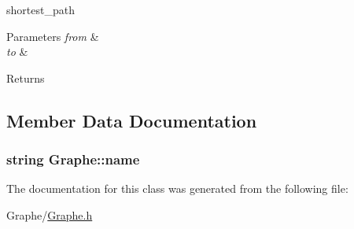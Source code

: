 shortest\+\_\+path 


\begin{DoxyParams}{Parameters}
{\em from} & \\
\hline
{\em to} & \\
\hline
\end{DoxyParams}
\begin{DoxyReturn}{Returns}

\end{DoxyReturn}


\subsection{Member Data Documentation}
\hypertarget{class_graphe_aba29a423311ef239951f6b6c37383444}{
\subsubsection[{name}]{\setlength{\rightskip}{0pt plus 5cm}string Graphe\+::name}}\label{class_graphe_aba29a423311ef239951f6b6c37383444}


The documentation for this class was generated from the following file\+:\begin{DoxyCompactItemize}
\item 
Graphe/\hyperlink{_graphe_8h}{Graphe.\+h}\end{DoxyCompactItemize}
